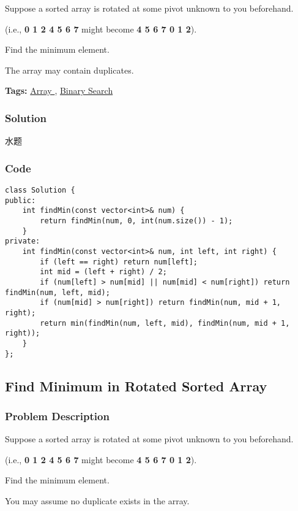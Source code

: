 \documentclass{article}
\begin{document}
\begin{CJK*}{UTF8}{gkai}
Suppose a sorted array is rotated at some pivot unknown to you beforehand.

(i.e., \textbf{0 1 2 4 5 6 7} might become \textbf{4 5 6 7 0 1 2}).

Find the minimum element.

The array may contain duplicates.


\textbf{Tags: }
\hyperref[ Array ]{ Array },  \hyperref[ Binary Search ]{ Binary Search }



\subsubsection*{Solution}
水题

\subsubsection*{Code}
\begin{lstlisting}
class Solution {
public:
    int findMin(const vector<int>& num) {
        return findMin(num, 0, int(num.size()) - 1);
    }
private:
    int findMin(const vector<int>& num, int left, int right) {
        if (left == right) return num[left];
        int mid = (left + right) / 2;
        if (num[left] > num[mid] || num[mid] < num[right]) return findMin(num, left, mid);
        if (num[mid] > num[right]) return findMin(num, mid + 1, right);
        return min(findMin(num, left, mid), findMin(num, mid + 1, right));
    }
};

\end{lstlisting}


\subsection{ Find Minimum in Rotated Sorted Array }
\label{ Find Minimum in Rotated Sorted Array }

\subsubsection*{Problem Description}
Suppose a sorted array is rotated at some pivot unknown to you beforehand.

(i.e., \textbf{0 1 2 4 5 6 7} might become \textbf{4 5 6 7 0 1 2}).

Find the minimum element.

You may assume no duplicate exists in the array.



\end{CJK*}
\end{document}
